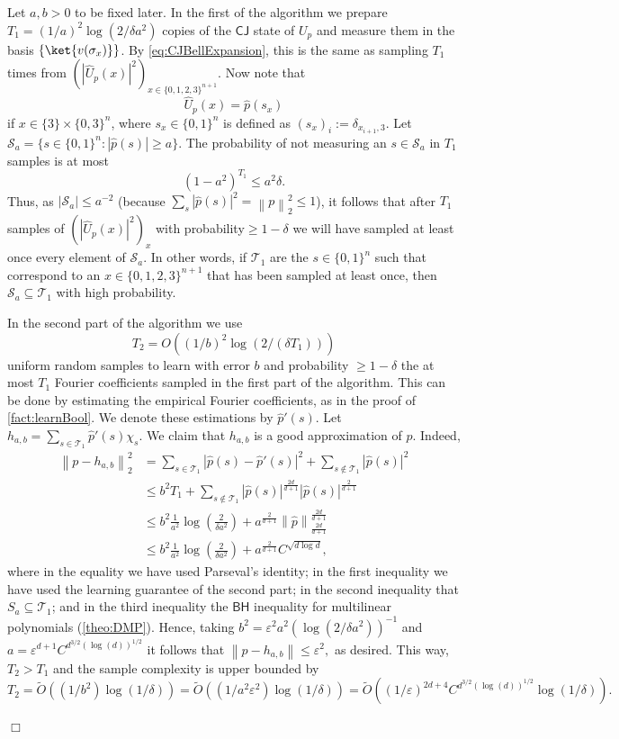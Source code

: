 \documentclass[11pt]{article}
\newcommand{\norm}[1]{\left\|{#1}\right\|}
\def\01{\{0,1\}}
\newcommand{\eps}{\varepsilon}
\newcommand{\BH}{\textsf{BH}}
\newcommand{\CJ}{\textsf{CJ}}
\theoremstyle{plain}
\theoremstyle{plain}
\theoremstyle{definition}
\theoremstyle{remark}
\renewenvironment{proof}[1][]{
    \begin{trivlist}
    \item[\hspace{\labelsep}{\em\noindent Proof#1:\/}]}
    {{\hfill$\Box$}
    \end{trivlist}
}
\theoremstyle{named}
\begin{document}
\begin{proof}[ of \cref{prop:learnBlockEncoding}]
    Let $a,b>0$ to be fixed later. In the first of the algorithm we prepare $T_1=(1/a)^{2}\log(2/\delta a^2)$ copies of the  $\CJ$ state of $U_p$ and measure them in the basis $\{\ket{v(\sigma_x)}\}$.
    By \cref{eq:CJBellExpansion}, this is the same as sampling $T_1$ times from $(|\widehat U_p(x)|^2)_{x\in\{0,1,2,3\}^{n+1}}$. Now note that $$\widehat U_p(x)=\widehat p( s_x)$$
    if $ x\in \{3\}\times \{0,3\}^n$, where $s_x\in \{0,1\}^n$ is defined as $(s_x)_i:=\delta_{x_{i+1},3}$. Let $\mathcal{S}_a=\{ s\in \01^n: |\widehat p( s)|\geq a\}$. The probability of not measuring an $s\in \mathcal{S}_a$ in $T_1$ samples is at most $$(1-a^2)^{T_1}\leq a^2 \delta.$$ Thus, as $|\mathcal{S}_a|\leq a^{-2}$ (because $\sum_{s}|\widehat p(s)|^2= \norm{p}_2^2\leq 1$), it follows that after $T_1$ samples of $(|\widehat U_p(x)|^2)_x$ with probability$\geq 1-\delta$ we will have sampled at least once every element of $\mathcal{S}_a$. In other words, if $\mathcal{T}_1$ are the $s\in \{0,1\}^n$ such that correspond to an $x\in\{0,1,2,3\}^{n+1}$ that has been sampled at least once, then $\mathcal{S}_a\subseteq \mathcal{T}_1$ with high probability. 

    In the second part of the algorithm we use $$T_2=O((1/b)^2\log(2/(\delta T_1)))$$ uniform random samples to learn with error $b$ and probability $\geq 1-\delta$ the at most $T_1$ Fourier coefficients sampled in the first part of the algorithm. This can be done by estimating the empirical Fourier coefficients, as in the proof of \cref{fact:learnBool}. We denote these estimations by $\widehat p'(s).$ Let $h_{a,b}=\sum_{s\in\mathcal{T}_1}\widehat p'(s)\chi_s.$ We claim that $h_{a,b}$ is a good approximation of $p$. Indeed, 
    \begin{align*}
        \norm{p-h_{a,b}}_2^2&= \sum_{s\in \mathcal{T}_1}|\widehat p(s)-\widehat p'(s)|^2+\sum_{s\notin \mathcal{T}_1}|\widehat p(s)|^2\\
        &\leq b^2T_1+\sum_{s\notin \mathcal{T}_1}|\widehat p(s)|^{\frac{2d}{d+1}}|\widehat p(s)|^{\frac{2}{d+1}}\\
        &\leq b^2\frac{1}{a^2}\log\left(\frac{2}{\delta a^2}\right)+a^{\frac{2}{d+1}}\norm{\widehat p}_{\frac{2d}{d+1}}^{\frac{2d}{d+1}}\\
        &\leq b^2\frac{1}{a^2}\log\left(\frac{2}{\delta a^2}\right)+a^{\frac{2}{d+1}}C^{\sqrt{d\log d}},
    \end{align*}
    where in the equality we have used Parseval's identity; in the first inequality we have used the learning guarantee of the second part; in the second inequality that $S_a\subseteq\mathcal{T}_1$; and in the third inequality the $\BH$ inequality for multilinear polynomials (\cref{theo:DMP}). 
    Hence, taking $b^2=\eps^2a^2(\log(2/\delta a^2))^{-1}$ and $a=\eps^{d+1}C^{d^{3/2}(\log (d))^{1/2}}$ it follows that $\norm{p-h_{a,b}}\leq \eps^2,$ as desired. This way, $T_2>T_1$ and the sample complexity is upper bounded by $$T_2=\widetilde O((1/b^2)\log(1/\delta))=\widetilde O((1/a^2\eps^2)\log(1/\delta))=\widetilde O((1/\eps)^{2d+4}C^{d^{3/2}(\log (d))^{1/2}}\log(1/\delta)).$$


\end{proof}
\end{document}
